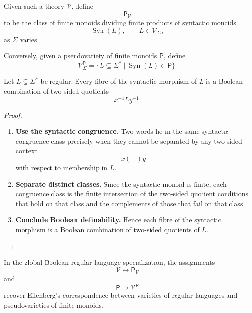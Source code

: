 Given such a theory \(\mathcal V\), define
\[
    \mathsf P_{\mathcal V}
\]
to be the class of finite monoids dividing finite products of syntactic
monoids
\[
    \operatorname{Syn}(L),
    \qquad
    L\in\mathcal V_\Sigma,
\]
as \(\Sigma\) varies.

Conversely, given a pseudovariety of finite monoids \(\mathsf P\), define
\[
    \mathcal V^{\mathsf P}_\Sigma
    =
    \{L\subseteq\Sigma^*
      \mid
      \operatorname{Syn}(L)\in\mathsf P\}.
\]

\begin{lemma}
\label{lem:syntactic-separation}
    Let \(L\subseteq\Sigma^*\) be regular. Every fibre of the syntactic
    morphism of \(L\) is a Boolean combination of two-sided quotients
    \[
        x^{-1}Ly^{-1}.
    \]
\end{lemma}

\begin{proof}
    \leavevmode
    \begin{enumerate}
        \item \textbf{Use the syntactic congruence.}
        Two words lie in the same syntactic congruence class precisely when they
        cannot be separated by any two-sided context
        \[
            x(-)y
        \]
        with respect to membership in \(L\).

        \item \textbf{Separate distinct classes.}
        Since the syntactic monoid is finite, each congruence class is the
        finite intersection of the two-sided quotient conditions that hold on
        that class and the complements of those that fail on that class.

        \item \textbf{Conclude Boolean definability.}
        Hence each fibre of the syntactic morphism is a Boolean combination of
        two-sided quotients of \(L\).
    \end{enumerate}
\end{proof}

\begin{theorem}
\label{thm:classical-eilenberg-recovery}
    In the global Boolean regular-language specialization, the assignments
    \[
        \mathcal V\longmapsto \mathsf P_{\mathcal V}
    \]
    and
    \[
        \mathsf P\longmapsto \mathcal V^{\mathsf P}
    \]
    recover Eilenberg's correspondence between varieties of regular languages
    and pseudovarieties of finite monoids.
\end{theorem}

